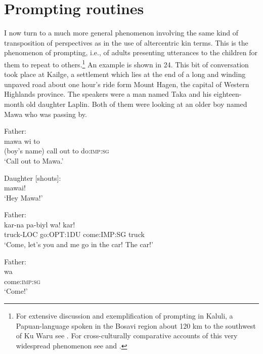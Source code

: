 \documentclass[output=paper]{langsci/langscibook}
\begin{document}
\section{Prompting routines}\label{s:ar5}

I now turn to a much more general phenomenon involving the same kind of transposition of perspectives as in the use of altercentric kin terms. This is the phenomenon of prompting, i.e., of adults presenting utterances to the children for them to repeat to others.\footnote{For extensive discussion and exemplification of prompting in Kaluli, a Papuan-language spoken in the Bosavi region about 120 km to the southwest of Ku Waru see \cite{Schieffelin1990}. For cross-culturally comparative accounts of this very widespread phenomenon see \cite{Demuth1986} and \cite{Moore2012}.} An example is shown in 24. This bit of conversation took place at Kailge, a settlement which lies at the end of a long and winding unpaved road about one hour’s ride form Mount Hagen, the capital of Western Highlands province. The speakers were a man named Taka and his eighteen-month old daughter Laplin. Both of them were looking at an older boy named Mawa who was passing by.

\begin{exe}
	\ex \label{ex:rumsey:ar24}
	\begin{xlist}
	\ex Father:\label{ex:rumsey:ar24a}\\
	\gll mawa wi to\\
	(boy’s name) call out to do:\textsc{imp}:\textsc{sg}\\
	\trans ‘Call out to Mawa.’ 	
	
	\ex Daughter [shouts]:\label{ex:rumsey:ar24b}\\
	mawai!\\
	\trans ‘Hey Mawa!’
	
	\ex Father:\label{ex:rumsey:ar24c}\\
	\gll kar-na pa-biyl wa! kar!\\
	truck-LOC go:OPT:1DU come:IMP:SG truck\\
	\trans ‘Come, let’s you and me go in the car! The car!’
	
	\ex Father:\label{ex:rumsey:ar24d}\\
	\gll wa\\
	come:\textsc{imp}:\textsc{sg}\\
	\trans ‘Come!’
	\end{xlist}
\end{exe}
\end{document}
